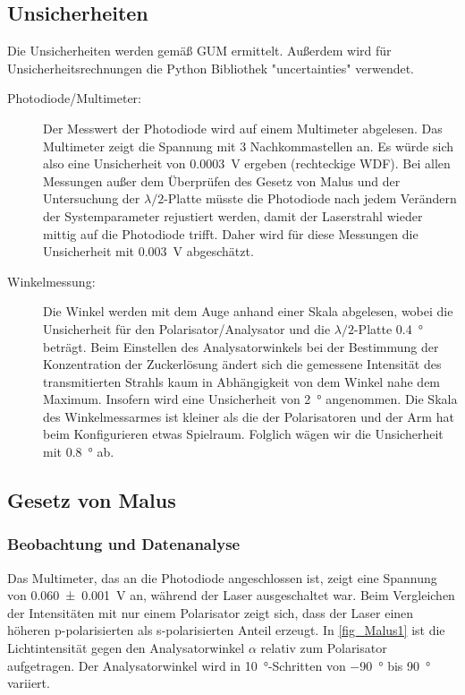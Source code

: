 \documentclass[
	a4paper,
	12pt,
	pagesize,
	ngerman
]{scrartcl}
\begin{document}
	\subsection{Unsicherheiten} %
	Die Unsicherheiten werden gemäß GUM ermittelt. 
	Außerdem wird für Unsicherheitsrechnungen die Python Bibliothek "uncertainties" verwendet.
	\begin{description}
		\item[Photodiode/Multimeter:] Der Messwert der Photodiode wird auf einem Multimeter abgelesen. 
			Das Multimeter zeigt die Spannung mit 3 Nachkommastellen an. 
			Es würde sich also eine Unsicherheit von \SI{0,0003}{V} ergeben (rechteckige WDF). %
			Bei allen Messungen außer dem Überprüfen des Gesetz von Malus und der Untersuchung der $\lambda/2$-Platte müsste die Photodiode nach jedem Verändern der Systemparameter rejustiert werden, damit der Laserstrahl wieder mittig auf die Photodiode trifft. 
			Daher wird für diese Messungen die Unsicherheit mit \SI{0,003}{V} abgeschätzt. %
		\item[Winkelmessung:]  Die Winkel werden mit dem Auge anhand einer Skala abgelesen, wobei die Unsicherheit für den Polarisator/Analysator und die $\lambda/2$-Platte \SI{0,4}{\degree} beträgt. 
			Beim Einstellen des Analysatorwinkels bei der Bestimmung der Konzentration der Zuckerlösung ändert sich die gemessene Intensität des transmitierten Strahls kaum in Abhängigkeit von dem Winkel nahe dem Maximum. 
			Insofern wird eine Unsicherheit von \SI{2}{\degree} angenommen.
			Die Skala des Winkelmessarmes ist kleiner als die der Polarisatoren und der Arm hat beim Konfigurieren etwas Spielraum. 
			Folglich wägen wir die Unsicherheit mit \SI{0,8}{\degree} ab.
	\end{description} 

	\subsection{Gesetz von Malus}
	\subsubsection{Beobachtung und Datenanalyse}
	Das Multimeter, das an die Photodiode angeschlossen ist, zeigt eine Spannung von \SI{0,060+-0,001}{V} an, während der Laser ausgeschaltet war.
	Beim Vergleichen der Intensitäten mit nur einem Polarisator zeigt sich, dass der Laser einen höheren p-polarisierten als s-polarisierten Anteil erzeugt.
	In \cref{fig_Malus1} ist die Lichtintensität gegen den Analysatorwinkel $\alpha$ relativ zum Polarisator aufgetragen.
	Der Analysatorwinkel wird in \SI{10}{\degree}-Schritten von \SI{-90}{\degree} bis \SI{90}{\degree} variiert.
\end{document}
